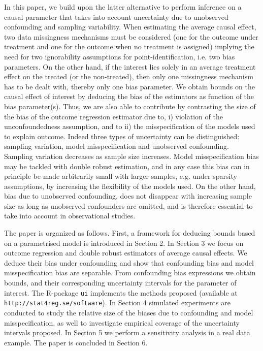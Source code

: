 \documentclass[11pt]{article}
\begin{document}
In this paper, we build upon the latter alternative to perform inference on a causal parameter that takes into account uncertainty due to unobserved confounding and sampling variability. When estimating the average causal effect, two data missingness mechanisms must be considered (one for the outcome under treatment and one for the outcome when no treatment is assigned) implying the need for two ignorability assumptions for point-identification, i.e. two bias parameters. On the other hand, if the interest lies solely in an average treatment effect on the treated (or the non-treated), then only one missingness mechanism has to be dealt with, thereby only one bias parameter. We obtain bounds on the causal effect of interest by deducing the bias of the estimators as function of the bias parameter(s). Thus, we are also able to contribute by contrasting the size of the bias of the outcome regression estimator due to, i) violation of the unconfoundedness assumption, and to ii) the misspecification of the models used to explain outcome. Indeed three types of uncertainty can be distinguished: sampling variation, model misspecification and unobserved confounding. Sampling variation decreases as sample size increases. Model misspecification bias may be tackled with double robust estimation, and in any case this bias can in principle be made arbitrarily small with larger samples, e.g. under sparsity assumptions, by increasing the flexibility of the models used. On the other hand, bias due to unobserved confounding, does not disappear with increasing sample size as long as unobserved confounders are omitted, and is therefore essential to take into account in observational studies. 

The paper is organized as follows. First, a framework for deducing bounds based on a parametrised model is introduced in Section 2. In Section 3 we focus on outcome regression and double robust estimators of average causal effects. We deduce their bias under confounding and show that confounding bias and model misspecification bias are separable. From confounding bias expressions we obtain bounds, and their corresponding uncertainty intervals for the parameter of interest. The R-package \texttt{ui} implements the methods proposed (available at \texttt{http://stat4reg.se/software}).  In Section 4 simulated experiments are conducted to study the relative size of the biases due to confounding and model misspecification, as well to investigate empirical coverage of the uncertainty intervals proposed. In Section 5 we perform a sensitivity analysis in a real data example. The paper is concluded in Section 6.
\end{document}
